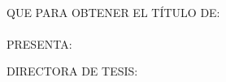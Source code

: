 \begin{titlepage}
\begin{minipage}[c][9.5cm][s]{10cm}
\begin{center}
      \\[8pt]
      QUE PARA OBTENER EL T\'ITULO DE:\\[3pt]
      \mbox{}\lacarrera\\[13pt]
      PRESENTA:\\[3pt]
      \elnombre

      \vspace{2cm}

      {\small DIRECTORA DE TESIS:\\ \eldirector}

      \vspace{2cm}

      \lafecha

    \end{center}
  \end{minipage}
\pagebreak
\end{titlepage}


